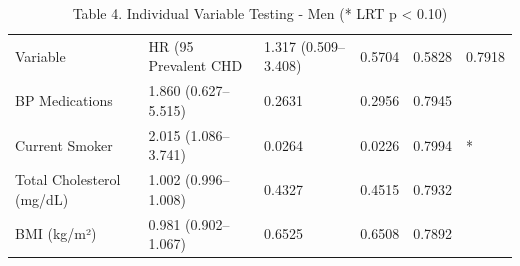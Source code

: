 \begin{table}[ht]
\centering
\caption{Table 4. Individual Variable Testing - Men (* LRT p < 0.10)} 
\begin{tabular}{llllll}
  \toprule
Variable & HR (95%
  \midrule
Prevalent CHD & 1.317 (0.509–3.408) & 0.5704 & 0.5828 & 0.7918 &  \\ 
  BP Medications & 1.860 (0.627–5.515) & 0.2631 & 0.2956 & 0.7945 &  \\ 
  Current Smoker & 2.015 (1.086–3.741) & 0.0264 & 0.0226 & 0.7994 & * \\ 
  Total Cholesterol (mg/dL) & 1.002 (0.996–1.008) & 0.4327 & 0.4515 & 0.7932 &  \\ 
  BMI (kg/m²) & 0.981 (0.902–1.067) & 0.6525 & 0.6508 & 0.7892 &  \\ 
   \bottomrule
\end{tabular}
\end{table}

